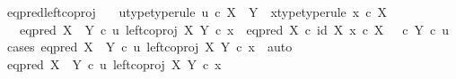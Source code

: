 \begin{isabellebody}
{}
\isamarkuptrue%
%
\endisatagdocument
{\isafolddocument}%
%
\isadelimdocument
%
\endisadelimdocument
{}\isamarkupfalse%
\ eq{\isacharunderscore}{\kern0pt}pred{\isacharunderscore}{\kern0pt}left{\isacharunderscore}{\kern0pt}coproj{\isacharcolon}{\kern0pt}\isanewline
\ \ \ u{\isacharunderscore}{\kern0pt}type{\isacharbrackleft}{\kern0pt}type{\isacharunderscore}{\kern0pt}rule{\isacharbrackright}{\kern0pt}{\isacharcolon}{\kern0pt}\ {\isachardoublequoteopen}u\ {\isasymin}\isactrlsub c\ X\ {\isasymCoprod}\ Y{\isachardoublequoteclose}\ \ x{\isacharunderscore}{\kern0pt}type{\isacharbrackleft}{\kern0pt}type{\isacharunderscore}{\kern0pt}rule{\isacharbrackright}{\kern0pt}{\isacharcolon}{\kern0pt}\ {\isachardoublequoteopen}x\ {\isasymin}\isactrlsub c\ X{\isachardoublequoteclose}\isanewline
\ \ \ {\isachardoublequoteopen}eq{\isacharunderscore}{\kern0pt}pred\ {\isacharparenleft}{\kern0pt}X\ {\isasymCoprod}\ Y{\isacharparenright}{\kern0pt}\ {\isasymcirc}\isactrlsub c\ {\isasymlangle}u{\isacharcomma}{\kern0pt}\ left{\isacharunderscore}{\kern0pt}coproj\ X\ Y\ {\isasymcirc}\isactrlsub c\ x{\isasymrangle}\ {\isacharequal}{\kern0pt}\ {\isacharparenleft}{\kern0pt}{\isacharparenleft}{\kern0pt}eq{\isacharunderscore}{\kern0pt}pred\ X\ {\isasymcirc}\isactrlsub c\ {\isasymlangle}id\ X{\isacharcomma}{\kern0pt}\ x\ {\isasymcirc}\isactrlsub c\ {\isasymbeta}\isactrlbsub X\isactrlesub {\isasymrangle}{\isacharparenright}{\kern0pt}\ {\isasymamalg}\ {\isacharparenleft}{\kern0pt}{\isasymf}\ {\isasymcirc}\isactrlsub c\ {\isasymbeta}\isactrlbsub Y\isactrlesub {\isacharparenright}{\kern0pt}{\isacharparenright}{\kern0pt}\ {\isasymcirc}\isactrlsub c\ u{\isachardoublequoteclose}\isanewline
%
\isadelimproof
%
\endisadelimproof
%
\isatagproof
{}\isamarkupfalse%
\ {\isacharparenleft}{\kern0pt}cases\ {\isachardoublequoteopen}eq{\isacharunderscore}{\kern0pt}pred\ {\isacharparenleft}{\kern0pt}X\ {\isasymCoprod}\ Y{\isacharparenright}{\kern0pt}\ {\isasymcirc}\isactrlsub c\ {\isasymlangle}u{\isacharcomma}{\kern0pt}\ left{\isacharunderscore}{\kern0pt}coproj\ X\ Y\ {\isasymcirc}\isactrlsub c\ x{\isasymrangle}{\isacharequal}{\kern0pt}\ {\isasymt}{\isachardoublequoteclose}{\isacharcomma}{\kern0pt}\ auto{\isacharparenright}{\kern0pt}\isanewline
\ \ \isamarkupfalse%
\ {\isachardoublequoteopen}eq{\isacharunderscore}{\kern0pt}pred\ {\isacharparenleft}{\kern0pt}X\ {\isasymCoprod}\ Y{\isacharparenright}{\kern0pt}\ {\isasymcirc}\isactrlsub c\ {\isasymlangle}u{\isacharcomma}{\kern0pt}\ left{\isacharunderscore}{\kern0pt}coproj\ X\ Y\ {\isasymcirc}\isactrlsub c\ x{\isasymrangle}\ {\isacharequal}{\kern0pt}\ {\isasymt}{\isachardoublequoteclose}\isanewline

\end{isabellebody}
